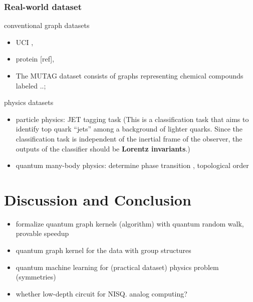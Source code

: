 \subsubsection{Real-world dataset}
conventional graph datasets
\begin{itemize}
	\item UCI \cite{kondorDiffusionKernelsGraphs2002}, 
	\item protein [ref], \cite{jumperHighlyAccurateProtein2021}
	\item The MUTAG dataset consists of graphs representing chemical compounds labeled ..;
\end{itemize}
physics datasets
\begin{itemize}
	\item particle physics: JET tagging task (This is a classification task that aims to identify top quark “jets” among a background of lighter quarks. Since the classification task is independent of the inertial frame of the observer, the outputs of the classifier should be \textbf{Lorentz invariants}.) \cite{bogatskiyLorentzGroupEquivariant2020}

	\item quantum many-body physics: determine phase transition
	\cite{carrasquillaMachineLearningPhases2017},
	topological order
	\cite{congQuantumConvolutionalNeural2019}
\end{itemize}

\section{Discussion and Conclusion}\label{sec:discussion}
\begin{itemize}
	\item formalize quantum graph kernels (algorithm) with quantum random walk, provable speedup
	\item quantum graph kernel for the data with group structures
	\item quantum machine learning for (practical dataset) physics problem (symmetries)
	\item whether low-depth circuit for NISQ. analog computing?
\end{itemize}

